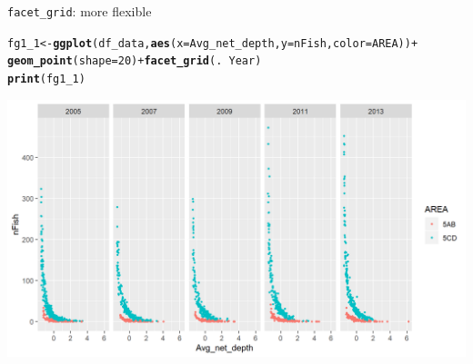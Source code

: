 \documentclass{beamer}\usepackage[]{graphicx}\usepackage[]{color}
\makeatletter
\newcommand{\hlnum}[1]{\textcolor[rgb]{0.686,0.059,0.569}{#1}}%
\newcommand{\hlopt}[1]{\textcolor[rgb]{0,0,0}{#1}}%
\newcommand{\hlstd}[1]{\textcolor[rgb]{0.345,0.345,0.345}{#1}}%
\newcommand{\hlkwb}[1]{\textcolor[rgb]{0.69,0.353,0.396}{#1}}%
\newcommand{\hlkwc}[1]{\textcolor[rgb]{0.333,0.667,0.333}{#1}}%
\newcommand{\hlkwd}[1]{\textcolor[rgb]{0.737,0.353,0.396}{\textbf{#1}}}%
\newenvironment{kframe}{%
 \def\at@end@of@kframe{}%
 \ifinner\ifhmode%
  \def\at@end@of@kframe{\end{minipage}}%
  \begin{minipage}{\columnwidth}%
 \fi\fi%
 \def\FrameCommand##1{\hskip\@totalleftmargin \hskip-\fboxsep
 \colorbox{shadecolor}{##1}\hskip-\fboxsep
     \hskip-\linewidth \hskip-\@totalleftmargin \hskip\columnwidth}%
 \MakeFramed {\advance\hsize-\width
   \@totalleftmargin\z@ \linewidth\hsize
   \@setminipage}}%
 {\par\unskip\endMakeFramed%
 \at@end@of@kframe}
\newenvironment{knitrout}{}{} %
\makeatother
\begin{document}
\begin{frame}[fragile]{\lstinline{facet_grid}: more flexible}
\begin{knitrout}\footnotesize
{}\color{fgcolor}\begin{kframe}
\begin{alltt}
\hlstd{fg1_1} \hlkwb{<-} \hlkwd{ggplot}\hlstd{(df_data,} \hlkwd{aes}\hlstd{(}\hlkwc{x}\hlstd{=Avg_net_depth,} \hlkwc{y}\hlstd{=nFish,} \hlkwc{color}\hlstd{=AREA))} \hlopt{+}
  \hlkwd{geom_point}\hlstd{(}\hlkwc{shape}\hlstd{=}\hlnum{20}\hlstd{)} \hlopt{+} \hlkwd{facet_grid}\hlstd{(.} \hlopt{~} \hlstd{Year)}
\hlkwd{print}\hlstd{(fg1_1)}
\end{alltt}
\end{kframe}

{\centering \includegraphics[width=.9\linewidth]{figure/facet_grid_1-1} 

}



\end{knitrout}
\end{frame}
\end{document}
